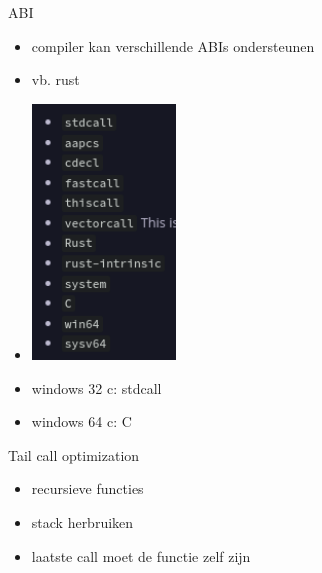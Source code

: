 \documentclass{beamer}
\begin{document}
\begin{frame}{ABI}
\begin{itemize}
    \item compiler kan verschillende ABIs ondersteunen
    \item vb. rust
    \item \includegraphics[width=0.3\textwidth]{abis.png}
    \item windows 32 c: stdcall
    \item windows 64 c: C
\end{itemize}
\end{frame}

\begin{frame}{Tail call optimization}
\begin{itemize}
    \item recursieve functies
    \item stack herbruiken
    \item laatste call moet de functie zelf zijn
\end{itemize}
\end{frame}
\end{document}
